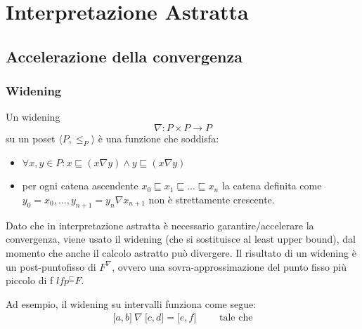 \documentclass[a4paper, 11pt]{report}
\begin{document}
	
\begin{frontespizio}
	\Preambolo{\usepackage{datetime}}
	\Scuola{}
\end{frontespizio}
	
	
	
\tableofcontents
	
	\chapter*{Interpretazione Astratta}
	
	\section*{Accelerazione della convergenza}
	\subsection*{Widening}
	Un widening \[ \nabla : P \times P \to P  \] su un poset $ \langle P, \leq_P \rangle $ è una funzione che soddisfa:
	\begin{itemize}
		\item $\forall x,y \in P : x \sqsubseteq (x \nabla y ) \wedge y \sqsubseteq (x \nabla y)$
		\item per ogni catena ascendente $x_0 \sqsubseteq x_1 \sqsubseteq ... \sqsubseteq x_n$ la catena definita come $y_0 = x_0, ..., y_{n+1} = y_n \nabla x_{n+1}$ non è strettamente crescente.
	\end{itemize}
	
	Dato che in interpretazione astratta è necessario garantire/accelerare la convergenza, viene usato il widening (che si sostituisce al least upper bound), dal momento che anche il calcolo astratto può divergere.
	Il risultato di un widening è un post-puntofisso  di $F^\nabla$, ovvero una sovra-approssimazione del punto fisso più piccolo di f $lfp^\sqsubseteq F$. 
	
	Ad esempio, il widening su intervalli funziona come segue:
	\begin{align*}
	\lbrack a, b \rbrack\ \nabla\ \lbrack c, d \rbrack = \lbrack e, f \rbrack \qquad \text{ tale che}
	\end{align*}
	
\end{document}
